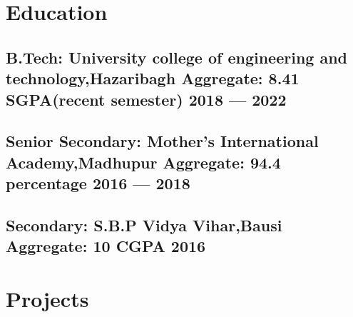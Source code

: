 \documentclass[a4,10pt]{article}
\newcommand{\hskills}[1]{
\textbf{\bfseries #1} }
\begin{document}
\section{Education }
\subsection*{B.Tech: {\normalsize \normalfont University college of engineering and technology,Hazaribagh \hskills{Aggregate: 8.41 }SGPA(recent semester)} \hfill  2018 --- 2022} 
\vspace{0.2cm}
\subsection*{Senior Secondary:  {\normalsize \normalfont Mother's International Academy,Madhupur \hskills{Aggregate: 94.4} percentage} \hfill 2016 --- 2018} 
\vspace{0.2cm}
\subsection*{Secondary:  {\normalsize \normalfont S.B.P Vidya Vihar,Bausi  \hskills{Aggregate: 10} CGPA} \hfill 2016} 
\vspace{0.2cm}



\section{ Projects} %



\end{document}

